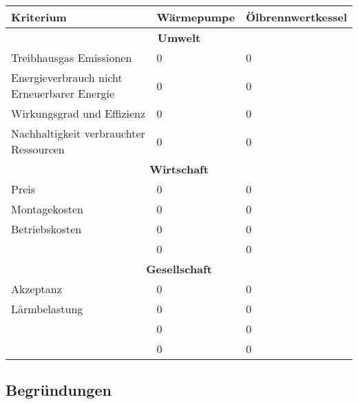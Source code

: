 \begin{center}
\begin{tabular}[c]{|p{}|p{}|p{}|}

  \hline
  \textbf{\Large{Kriterium}} &
  \textbf{\Large{Wärmepumpe}} &
  \textbf{\Large{Ölbrennwertkessel}} \\ \hline

  \multicolumn{3}{|c|}{\textbf{\Large{Umwelt}}} \\ \hline
  
  Treibhausgas Emissionen
  & 0 & 0 \\
  Energieverbrauch nicht Erneuerbarer Energie
  & 0 & 0 \\
  Wirkungsgrad und Effizienz
  & 0 & 0 \\
  Nachhaltigkeit verbrauchter Ressourcen
  & 0 & 0 \\
  \hline
  
  \multicolumn{3}{|c|}{\textbf{\Large{Wirtschaft}}} \\ \hline
  
  Preis
  & 0 & 0 \\
  Montagekosten
  & 0 & 0 \\
  Betriebskosten
  & 0 & 0 \\
  
  & 0 & 0 \\
  \hline

  \multicolumn{3}{|c|}{\textbf{\Large{Gesellschaft}}} \\ \hline

  Akzeptanz
  & 0 & 0 \\
  Lärmbelastung
  & 0 & 0 \\

  & 0 & 0 \\

  & 0 & 0 \\
  \hline

\end{tabular}
\end{center}

\subsection{Begründungen}


